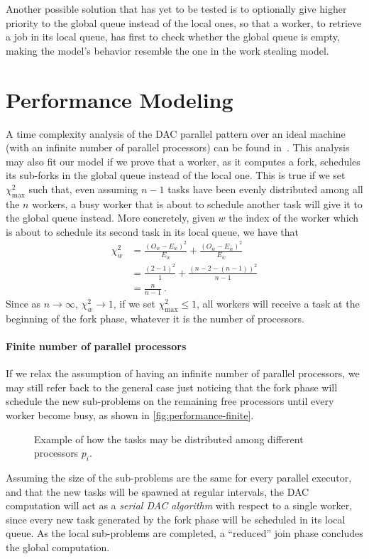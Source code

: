 \documentclass[11pt, a4paper]{article}
\begin{document}
Another possible solution that has yet to be tested is to optionally give higher priority to the global queue instead of the local ones, so that a worker, to retrieve a job in its local queue, has first to check whether the global queue is empty, making the model's behavior resemble the one in the work stealing model.

\section{Performance Modeling}\label{sec:performance}

A time complexity analysis of the DAC parallel pattern over an ideal machine (with an infinite number of parallel processors) can be found in~\cite{mccool2012structured}. This analysis may also fit our model if we prove that a worker, as it computes a fork, schedules its sub-forks in the global queue instead of the local one. This is true if we set $\chi^2_{\text{max}}$ such that, even assuming $n-1$ tasks have been evenly distributed among all the $n$ workers, a busy worker that is about to schedule another task will give it to the global queue instead. More concretely, given $w$ the index of the worker which is about to schedule its second task in its local queue, we have that
%
\begin{align*}
\chi^2_w &= \frac{(O_w - E_w)^2}{E_w} + \frac{(O_{\overline{w}} - E_{\overline{w}})^2}{E_{\overline{w}}} \\
&= \frac{(2 - 1)^2}{1} + \frac{(n - 2 - (n-1))^2}{n-1} \\
&= \frac{n}{n-1}\ .
\end{align*}
%
Since as $n \rightarrow \infty$, $\chi^2_w \rightarrow 1$, if we set $\chi^2_{\text{max}} \le 1$, all workers will receive a task at the beginning of the fork phase, whatever it is the number of processors.

\paragraph{Finite number of parallel processors} If we relax the assumption of having an infinite number of parallel processors, we may still refer back to the general case just noticing that the fork phase will schedule the new sub-problems on the remaining free processors until every worker become busy, as shown in \autoref{fig:performance-finite}. 
%
\begin{figure}[b]
	\centering
	
	\caption{Example of how the tasks may be distributed among different processors $p_i$.}
	\label{fig:performance-finite}
\end{figure}
%
Assuming the size of the sub-problems are the same for every parallel executor, and that the new tasks will be spawned at regular intervals, the DAC computation will act as a \emph{serial DAC algorithm} with respect to a single worker, since every new task generated by the fork phase will be scheduled in its local queue. As the local sub-problems are completed, a ``reduced'' join phase concludes the global computation. 
\end{document}
